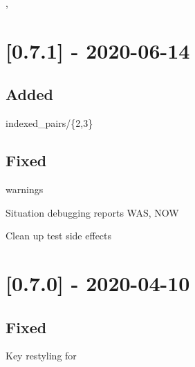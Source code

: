 \begin{shortlist}
    \item {}
    \item {}
    \item {}
    \item {}, 
\end{shortlist}

\section{[0.7.1] - 2020-06-14}

\subsection{Added}

\begin{shortlist}
    \item indexed_pairs/\{2,3\}
    \item {}
    \item {}
    \item {}
\end{shortlist}

\subsection{Fixed}

\begin{shortlist}
    \item {} warnings
    \item Situation debugging reports WAS, NOW
    \item Clean up test side effects
\end{shortlist}

\section{[0.7.0] - 2020-04-10}

\subsection{Fixed}

\begin{shortlist}
    \item Key restyling for 
\end{shortlist}

